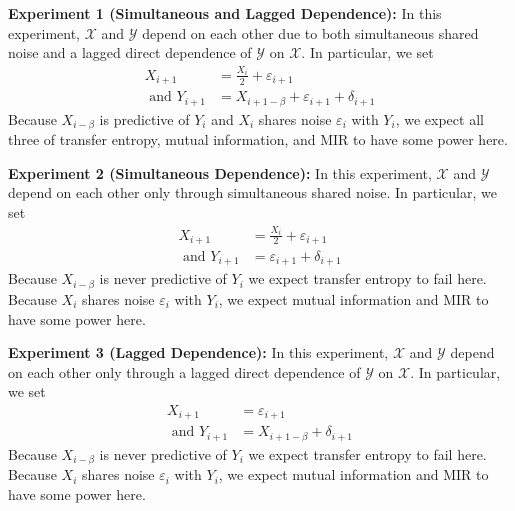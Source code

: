 \documentclass{article} %
\newcommand{\e}{\varepsilon}                        %
\newcommand{\X}{\mathcal{X}}                        %
\newcommand{\Y}{\mathcal{Y}}                        %
\begin{document}
{\bf Experiment 1 (Simultaneous and Lagged Dependence):} In this experiment,
$\X$ and $\Y$ depend on each other due to both simultaneous shared noise and a
lagged direct dependence of $\Y$ on $\X$. In particular, we set
\begin{align*}
                X_{i + 1} & = \frac{X_i}{2} + \e_{i + 1}  \\
\mbox{ and }    Y_{i + 1} & = X_{i + 1 - \beta} + \e_{i + 1} + \delta_{i + 1}
\end{align*}
Because $X_{i - \beta}$ is predictive of $Y_i$ and $X_i$ shares noise $\e_i$
with $Y_i$, we expect all three of transfer entropy, mutual information, and
MIR to have some power here.

{\bf Experiment 2 (Simultaneous Dependence):} In this experiment, $\X$ and $\Y$
depend on each other only through simultaneous shared noise. In particular, we
set
\begin{align*}
                X_{i + 1} & = \frac{X_i}{2} + \e_{i + 1}  \\
\mbox{ and }    Y_{i + 1} & = \e_{i + 1} + \delta_{i + 1}
\end{align*}
Because $X_{i - \beta}$ is never predictive of $Y_i$ we expect transfer entropy
to fail here. Because $X_i$ shares noise $\e_i$ with $Y_i$, we expect mutual
information and MIR to have some power here.

{\bf Experiment 3 (Lagged Dependence):} In this experiment, $\X$ and $\Y$
depend on each other only through a lagged direct dependence of $\Y$ on $\X$.
In particular, we set
\begin{align*}
                X_{i + 1} & = \e_{i + 1}  \\
\mbox{ and }    Y_{i + 1} & = X_{i + 1 - \beta} + \delta_{i + 1}
\end{align*}
Because $X_{i - \beta}$ is never predictive of $Y_i$ we expect transfer entropy
to fail here. Because $X_i$ shares noise $\e_i$ with $Y_i$, we expect mutual
information and MIR to have some power here.
\end{document}
